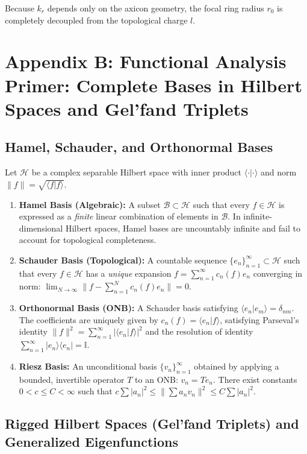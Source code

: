 \documentclass{optica-article}
\begin{document}
Because $k_r$ depends only on the axicon geometry, the focal ring radius $r_0$ is completely decoupled from the topological charge $l$.

\section{Appendix B: Functional Analysis Primer: Complete Bases in Hilbert Spaces and Gel'fand Triplets}
\label{app:hilbert}

\subsection{Hamel, Schauder, and Orthonormal Bases}

Let $\mathcal{H}$ be a complex separable Hilbert space with inner product $\langle \cdot | \cdot \rangle$ and norm $\|f\| = \sqrt{\langle f | f \rangle}$.
\begin{enumerate}
    \item \textbf{Hamel Basis (Algebraic):} A subset $\mathcal{B} \subset \mathcal{H}$ such that every $f \in \mathcal{H}$ is expressed as a \emph{finite} linear combination of elements in $\mathcal{B}$. In infinite-dimensional Hilbert spaces, Hamel bases are uncountably infinite and fail to account for topological completeness.
    \item \textbf{Schauder Basis (Topological):} A countable sequence $\{e_n\}_{n=1}^\infty \subset \mathcal{H}$ such that every $f \in \mathcal{H}$ has a \emph{unique} expansion $f = \sum_{n=1}^\infty c_n(f) e_n$ converging in norm: $\lim_{N \to \infty} \|f - \sum_{n=1}^N c_n(f) e_n\| = 0$.
    \item \textbf{Orthonormal Basis (ONB):} A Schauder basis satisfying $\langle e_n | e_m \rangle = \delta_{nm}$. The coefficients are uniquely given by $c_n(f) = \langle e_n | f \rangle$, satisfying Parseval's identity $\|f\|^2 = \sum_{n=1}^\infty |\langle e_n | f \rangle|^2$ and the resolution of identity $\sum_{n=1}^\infty |e_n\rangle \langle e_n| = \mathbb{I}$.
    \item \textbf{Riesz Basis:} An unconditional basis $\{v_n\}_{n=1}^\infty$ obtained by applying a bounded, invertible operator $T$ to an ONB: $v_n = T e_n$. There exist constants $0 < c \le C < \infty$ such that $c \sum |a_n|^2 \le \|\sum a_n v_n\|^2 \le C \sum |a_n|^2$.
\end{enumerate}

\subsection{Rigged Hilbert Spaces (Gel'fand Triplets) and Generalized Eigenfunctions}
\end{document}
